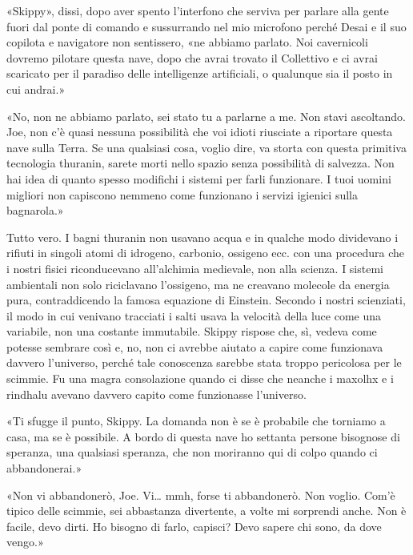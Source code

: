 «Skippy», dissi, dopo aver spento l'interfono che serviva per parlare
alla gente fuori dal ponte di comando e sussurrando nel mio microfono
perché Desai e il suo copilota e navigatore non sentissero, «ne abbiamo
parlato. Noi cavernicoli dovremo pilotare questa nave, dopo che avrai
trovato il Collettivo e ci avrai scaricato per il paradiso delle
intelligenze artificiali, o qualunque sia il posto in cui andrai.»

«No, non ne abbiamo parlato, sei stato tu a parlarne a me. Non stavi
ascoltando. Joe, non c'è quasi nessuna possibilità che voi idioti
riusciate a riportare questa nave sulla Terra. Se una qualsiasi cosa,
voglio dire, va storta con questa primitiva tecnologia thuranin, sarete
morti nello spazio senza possibilità di salvezza. Non hai idea di quanto
spesso modifichi i sistemi per farli funzionare. I tuoi uomini migliori
non capiscono nemmeno come funzionano i servizi igienici sulla
bagnarola.»

Tutto vero. I bagni thuranin non usavano acqua e in qualche modo
dividevano i rifiuti in singoli atomi di idrogeno, carbonio, ossigeno
ecc. con una procedura che i nostri fisici riconducevano all'alchimia
medievale, non alla scienza. I sistemi ambientali non solo riciclavano
l'ossigeno, ma ne creavano molecole da energia pura, contraddicendo la
famosa equazione di Einstein. Secondo i nostri scienziati, il modo in
cui venivano tracciati i salti usava la velocità della luce come una
variabile, non una costante immutabile. Skippy rispose che, sì, vedeva
come potesse sembrare così e, no, non ci avrebbe aiutato a capire come
funzionava davvero l'universo, perché tale conoscenza sarebbe stata
troppo pericolosa per le scimmie. Fu una magra consolazione quando ci
disse che neanche i maxolhx e i rindhalu avevano davvero capito come
funzionasse l'universo.

«Ti sfugge il punto, Skippy. La domanda non è se è probabile che
torniamo a casa, ma se è possibile. A bordo di questa nave ho settanta
persone bisognose di speranza, una qualsiasi speranza, che non moriranno
qui di colpo quando ci abbandonerai.»

«Non vi abbandonerò, Joe. Vi\ldots{} mmh, forse ti abbandonerò. Non
voglio. Com'è tipico delle scimmie, sei abbastanza divertente, a volte
mi sorprendi anche. Non è facile, devo dirti. Ho bisogno di farlo,
capisci? Devo sapere chi sono, da dove vengo.»

